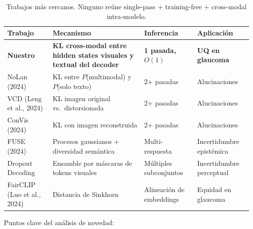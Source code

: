 \documentclass[12pt,a4paper]{article}
\begin{document}
\begin{table}[H]
\centering
\small
\caption{Trabajos más cercanos. Ninguno reúne single-pass + training-free
+ cross-modal intra-modelo.}
\label{tab:sota}
\begin{tabularx}{\textwidth}{lXXl}
\toprule
\textbf{Trabajo} & \textbf{Mecanismo} & \textbf{Inferencia} & \textbf{Aplicación} \\
\midrule
\textbf{Nuestro} & \textbf{KL cross-modal entre hidden states visuales y textual del decoder} & \textbf{1 pasada, $O(1)$} & \textbf{UQ en glaucoma} \\
NoLan (2024) & KL entre $P$(multimodal) y $P$(solo texto) & 2+ pasadas & Alucinaciones \\
VCD (Leng et al., 2024) & KL imagen original vs.\ distorsionada & 2+ pasadas & Alucinaciones \\
ConVis (2024) & KL con imagen reconstruida & 2+ pasadas & Alucinaciones \\
FUSE (2024) & Procesos gaussianos + diversidad semántica & Multi-respuesta & Incertidumbre epistémica \\
Dropout Decoding & Ensamble por máscaras de tokens visuales & Múltiples subconjuntos & Incertidumbre perceptual \\
FairCLIP (Luo et al., 2024) & Distancia de Sinkhorn & Alineación de embeddings & Equidad en glaucoma \\
\bottomrule
\end{tabularx}
\end{table}

Puntos clave del análisis de novedad:
\end{document}
